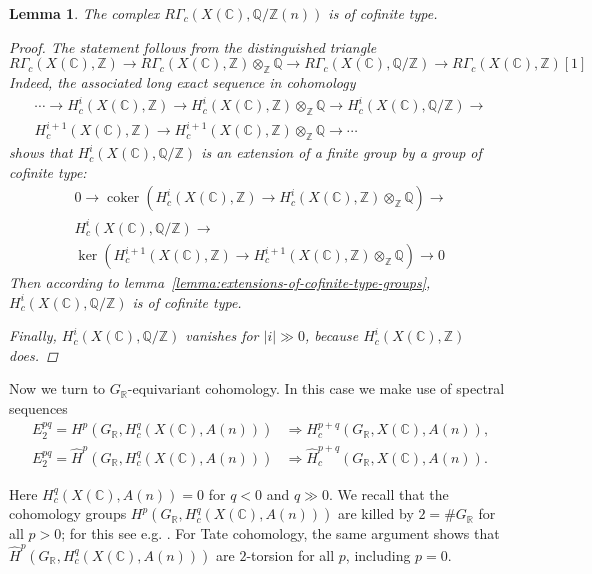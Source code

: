 \documentclass[leqno,12pt]{article}
\theoremstyle{plain}
\newtheorem{lemma}[theorem]{\indent\sc Lemma}
\theoremstyle{definition}
\DeclareMathOperator{\coker}{coker}
\newcommand{\ZZ}{\mathbb{Z}}
\newcommand{\QQ}{\mathbb{Q}}
\newcommand{\RR}{\mathbb{R}}
\newcommand{\CC}{\mathbb{C}}
\begin{document}
\begin{lemma}
  The complex $R\Gamma_c (X (\CC), \QQ/\ZZ (n))$ is of cofinite type.

  \begin{proof}
    The statement follows from the distinguished triangle
    \[ R\Gamma_c (X (\CC), \ZZ) \to
    R\Gamma_c (X (\CC), \ZZ)\otimes_\ZZ \QQ \to
    R\Gamma_c (X (\CC), \QQ/\ZZ) \to
    R\Gamma_c (X (\CC), \ZZ) [1] \]
    Indeed, the associated long exact sequence in cohomology
    \begin{multline*}
      \cdots \to H^i_c (X (\CC), \ZZ) \to
      H^i_c (X (\CC), \ZZ)\otimes_\ZZ \QQ \to
      H^i_c (X (\CC), \QQ/\ZZ) \to\\
      H^{i+1}_c (X (\CC), \ZZ) \to
      H^{i+1}_c (X (\CC), \ZZ)\otimes_\ZZ \QQ \to \cdots
    \end{multline*}
    shows that $H^i_c (X (\CC), \QQ/\ZZ)$ is an extension of a finite group by a
    group of cofinite type:
    \begin{multline*}
      0 \to \coker (H^i_c (X (\CC), \ZZ) \to
      H^i_c (X (\CC), \ZZ)\otimes_\ZZ \QQ) \to\\
      H^i_c (X (\CC), \QQ/\ZZ) \to\\
      \ker (H^{i+1}_c (X (\CC), \ZZ) \to
      H^{i+1}_c (X (\CC), \ZZ)\otimes_\ZZ \QQ) \to 0
    \end{multline*}
    Then according to lemma~\ref{lemma:extensions-of-cofinite-type-groups},
    $H^i_c (X (\CC), \QQ/\ZZ)$ is of cofinite type.

    Finally, $H^i_c (X (\CC), \QQ/\ZZ)$ vanishes for $|i| \gg 0$, because
    $H^i_c (X (\CC), \ZZ)$ does.
  \end{proof}
\end{lemma}

Now we turn to $G_\RR$-equivariant cohomology. In this case we make use of
spectral sequences
\begin{align*}
  E_2^{pq} = H^p (G_\RR, H_c^q (X (\CC), A (n))) & \Longrightarrow H_c^{p+q} (G_\RR, X (\CC), A (n)), \\
  E_2^{pq} = \widehat{H}^p (G_\RR, H_c^q (X (\CC), A (n))) & \Longrightarrow \widehat{H}_c^{p+q} (G_\RR, X (\CC), A (n)).
\end{align*}

Here $H_c^q (X (\CC), A (n)) = 0$ for $q < 0$ and $q \gg 0$. We recall that the
cohomology groups $H^p (G_\RR, H_c^q (X (\CC), A (n)))$ are killed by
$2 = \# G_\RR$ for all $p > 0$; for this see e.g.
\cite[Theorem~6.5.8]{Weibel-1994}. For Tate cohomology, the same argument shows
that $\widehat{H}^p (G_\RR, H_c^q (X (\CC), A (n)))$ are $2$-torsion for all
$p$, including $p = 0$.
\end{document}
